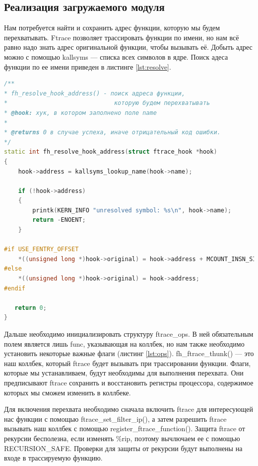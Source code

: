 \documentclass[a4paper,14pt]{article}
\begin{document}
\subsection{Реализация загружаемого модуля}

Нам потребуется найти и сохранить адрес функции, которую мы будем перехватывать. Ftrace позволяет трассировать функции по имени, но нам всё равно надо знать адрес оригинальной функции, чтобы вызывать её. Добыть адрес можно с помощью kallsyms — списка всех символов в ядре. Поиск адеса функции по ее имени приведен в листинге \ref{lst:resolve}.

\begin{lstlisting}[language=C++,label={lst:resolve}, caption=\text{Поиск адреса функции по ее имени.}]
/**
* fh_resolve_hook_address() - поиск адреса функции, 
* 							   которую будем перехватывать
* @hook: хук, в котором заполнено поле name
*
* @returns 0 в случае успеха, иначе отрицательный код ошибки.
*/
static int fh_resolve_hook_address(struct ftrace_hook *hook)
{
	hook->address = kallsyms_lookup_name(hook->name);
  
	if (!hook->address)
    {
		printk(KERN_INFO "unresolved symbol: %s\n", hook->name);
		return -ENOENT;
    }
  
#if USE_FENTRY_OFFSET
   	*((unsigned long *)hook->original) = hook->address + MCOUNT_INSN_SIZE;
#else
	*((unsigned long *)hook->original) = hook->address;
#endif
   
   return 0;
}
\end{lstlisting}

Дальше необходимо инициализировать структуру ftrace\_ops. В ней обязательным
полем является лишь func, указывающая на коллбек, но нам также необходимо
установить некоторые важные флаги (листинг \ref{lst:ops}). fh\_ftrace\_thunk() — это наш коллбек, который ftrace будет вызывать при трассировании функции. Флаги, которые мы устанавливаем, будут необходимы для выполнения перехвата. Они предписывают ftrace сохранить и восстановить регистры процессора, содержимое которых мы сможем изменить в коллбеке.

Для включения перехвата необходимо сначала включить ftrace для интересующей нас функции с помощью ftrace\_set\_filter\_ip(), а затем разрешить ftrace вызывать наш коллбек с помощью register\_ftrace\_function(). Защита ftrace от рекурсии бесполезна, если изменять \%rip, поэтому вычлючаем ее с помощью RECURSION\_SAFE. Проверки для защиты от рекурсии будут выполнены на входе в трассируемую функцию.
\end{document}
